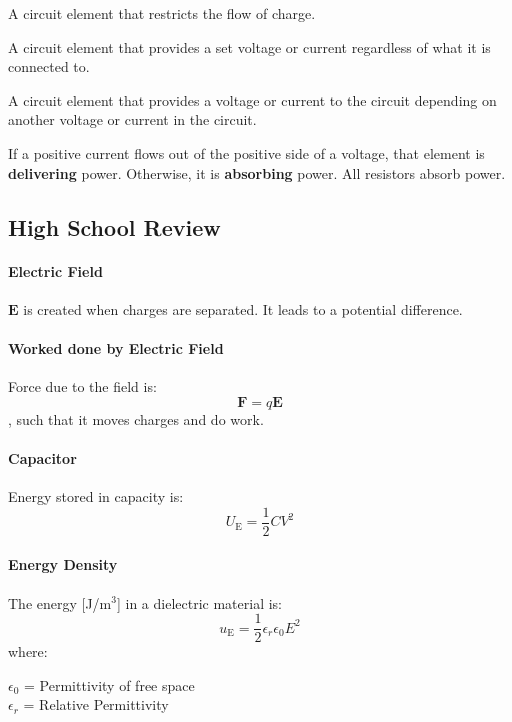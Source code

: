 \documentclass[11pt]{report}
\begin{document}
    \begin{definition}[Resistors]
    A circuit element that restricts the flow of charge.
    \end{definition}
    
    \begin{definition}
    A circuit element that provides a set voltage or current regardless of what it is connected to.
    \end{definition}
    
    \begin{definition}
    A circuit element that provides a voltage or current to the circuit depending on another voltage or current in the circuit.
    \end{definition}
    
    \begin{definition}
    If a positive current flows out of the positive side of a voltage, that element is \textbf{delivering} power. Otherwise, it is \textbf{absorbing} power. All resistors absorb power.
    \end{definition}
\subsection{High School Review}
\paragraph{Electric Field} $\textbf{E}$ is created when charges are separated. It leads to a potential difference.
\paragraph{Worked done by Electric Field} Force due to the field is:
\begin{equation}
    \textbf{F} = q\textbf{E}
\end{equation}
, such that it moves charges and do work.
\paragraph{Capacitor} Energy stored in capacity is:
\begin{equation}
    U_\text{E} = \frac{1}{2}CV^2
\end{equation}
\paragraph{Energy Density} The energy [J/m$^3$] in a dielectric material is:
\begin{equation}
    u_\text{E} = \frac{1}{2}\epsilon_r \epsilon_0 E^2
\end{equation}
where:
\begin{center}
    $\epsilon_0$ = Permittivity of free space \\
    $\epsilon_r$ = Relative Permittivity
\end{center}
\end{document}
